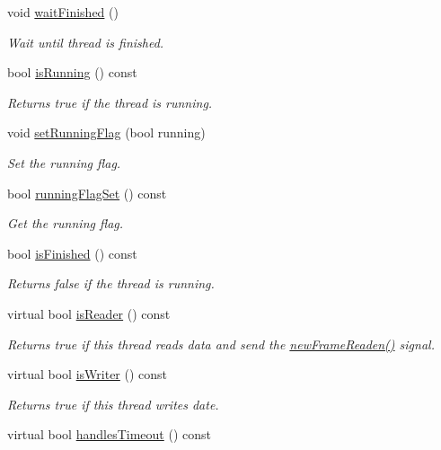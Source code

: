 \begin{DoxyCompactItemize}
void \hyperlink{classmdt_port_thread_a621c0748a16bc9ee15983ef488314c85}{waitFinished} ()
\begin{DoxyCompactList}\small\item\em Wait until thread is finished. \end{DoxyCompactList}\item 
bool \hyperlink{classmdt_port_thread_ae1becf17263dd9fbf5dfcc6c51eddd72}{isRunning} () const 
\begin{DoxyCompactList}\small\item\em Returns true if the thread is running. \end{DoxyCompactList}\item 
void \hyperlink{classmdt_port_thread_ad9bcfaa66fba25512f2677a7e320c6c8}{setRunningFlag} (bool running)
\begin{DoxyCompactList}\small\item\em Set the running flag. \end{DoxyCompactList}\item 
bool \hyperlink{classmdt_port_thread_abce96e61e09780841b729f28ab9054f0}{runningFlagSet} () const 
\begin{DoxyCompactList}\small\item\em Get the running flag. \end{DoxyCompactList}\item 
bool \hyperlink{classmdt_port_thread_a55d7ef615447823bf9878492a2c88fd4}{isFinished} () const 
\begin{DoxyCompactList}\small\item\em Returns false if the thread is running. \end{DoxyCompactList}\item 
virtual bool \hyperlink{classmdt_port_thread_acdb3d96287c571cc08ef39860dc324b1}{isReader} () const 
\begin{DoxyCompactList}\small\item\em Returns true if this thread reads data and send the \hyperlink{classmdt_port_thread_a7fc2245c753fd65e1beffec211c41461}{newFrameReaden()} signal. \end{DoxyCompactList}\item 
virtual bool \hyperlink{classmdt_port_thread_a0122a12262052cf3643241a3eaa31c58}{isWriter} () const 
\begin{DoxyCompactList}\small\item\em Returns true if this thread writes date. \end{DoxyCompactList}\item 
virtual bool \hyperlink{classmdt_port_thread_aaf671b84f7c1fb508ff9221dccee4c15}{handlesTimeout} () const 

\end{DoxyCompactItemize}
